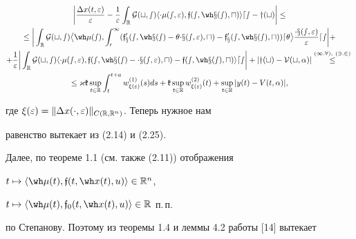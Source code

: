 \begin{multline*}


\bigg|\frac{\Dl x(t,\ve)}{\ve}- \frac{1}{\ve}\int_{\R}\pG(t,s)


\la\Dl\mu(s,\ve),\frak{f}(s,\wh x(s),u)\ra ds-y(t)\bigg|\le\\


\le\bigg|\int_{\R}\pG(t,s)\big\la\wh\mu(s),\int_{0}^{1}


(\frak{f}'_{x}(s,\wh x(s)-\ta\Dl x(s,\ve),u)-


\frak{f}'_{x}(s,\wh x(s),u))d\ta\big\ra


\frac{\Dl x(s,\ve)}{\ve}ds\bigg|+ \\


+\frac{1}{\ve}\bigg|\int_{\R}\pG(t,s)


\la\Dl\mu(s,\ve),\frak{f}(s,\wh x(s)-\Dl x(s,\ve),u)


-\frak{f}(s,\wh x(s),u)\ra ds\bigg|+|y(t)-V(t,\alpha)|


\overset{(1.8),\ (3.2)}{\le}{}\\


\le\ak\gk\sup_{t\in\R}\int_{t}^{t+a}w_{\xi(\ve)}^{(1)}(s)ds+


\gk\sup\lt_{t\in\R}w_{\xi(\ve)}^{(2)}(t)+ \sup\lt_{t\in\R}|y(t)-V(t,\alpha)|,


\end{multline*}


где $\xi(\varepsilon)=\|\Delta x(\cdot,\varepsilon)\|_{C(\Bbb R,\Bbb R^n)}$. Теперь нужное нам


равенство вытекает из (2.14) и (2.25).





Далее, по теореме 1.1 (см. также (2.11)) отображения


$t\mapsto\la\wh\mu(t),\frak{f}(t,\wh x(t),u)\ra\in\R^{n}$,\linebreak


$t\mapsto\la\wh\mu(t),\frak{f}_{0}(t,\wh x(t),u)\ra\in\R$ п.\,п.


по Степанову. Поэтому из теоремы 1.4 и леммы 4.2 работы [14] вытекает





